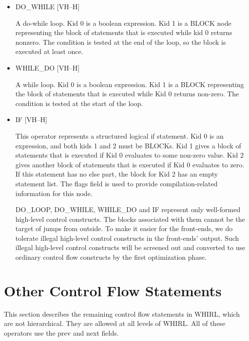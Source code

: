 \begin{itemize}
\item
{}%
DO\_WHILE \hfill [VH--H]

A do-while loop. Kid 0 is a boolean expression. Kid 1 is a
%
BLOCK node
representing the block of statements that is executed while kid
0 returns nonzero. The condition is tested at the end of the loop,
so the block is executed at least once.

\item
{}%
WHILE\_DO \hfill [VH--H]

A while loop. Kid 0 is a boolean expression. Kid 1 is a
%
BLOCK
representing the block of statements that is executed while Kid
0 returns non-zero.
The condition is tested at the start of the loop. 

\item
{}%
IF \hfill [VH--H]

This operator represents a structured logical if statement. Kid 0
is an expression, and both kids 1 and 2 must be
%
BLOCKs. Kid 1 gives a block of statements that is executed if Kid 0
evaluates to some non-zero value. Kid
2 gives another block of statements that is executed if Kid 0
evaluates to zero. If this statement has no else part, the block
for Kid 2 has an empty statement list. The flags field is used to
provide compilation-related information for this node.

%
DO\_LOOP,
%
DO\_WHILE,
%
WHILE\_DO and
%
IF represent only well-formed high-level
control constructs. The blocks associated with them cannot be the
target of jumps from outside. To make it easier for the front-ends,
we do tolerate illegal high-level control constructs in the front-ends'
output. Such illegal high-level control constructs will be screened
out and converted to use ordinary control flow constructs by the
first optimization phase.

\end{itemize}
\section{Other Control Flow Statements}

This section describes the remaining control flow statements in
WHIRL, which are not hierarchical. They are allowed at all levels
of WHIRL. All of these operators use the prev and next fields.

